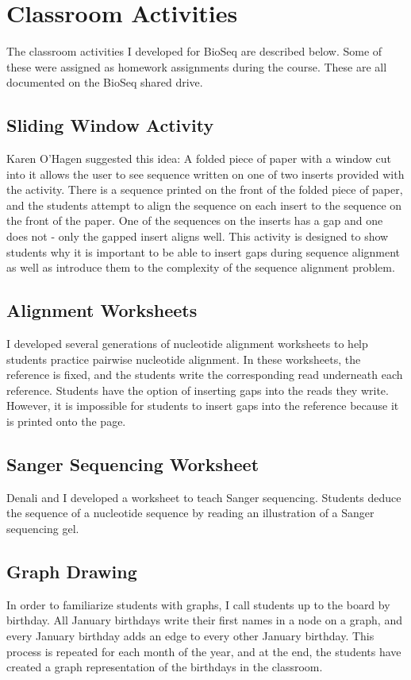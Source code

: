 \documentclass{report}
\begin{document}
\section{Classroom Activities}
The classroom activities I developed for BioSeq are described below. Some of these were assigned as homework assignments during the course. These are all documented on the BioSeq shared drive.

\subsection{Sliding Window Activity}
Karen O'Hagen suggested this idea: A folded piece of paper with a window cut into it allows the user to see sequence written on one of two inserts provided with the activity. There is a sequence printed on the front of the folded piece of paper, and the students attempt to align the sequence on each insert to the sequence on the front of the paper. One of the sequences on the inserts has a gap and one does not - only the gapped insert aligns well. This activity is designed to show students why it is important to be able to insert gaps during sequence alignment as well as introduce them to the complexity of the sequence alignment problem.

\subsection{Alignment Worksheets}
I developed several generations of nucleotide alignment worksheets to help students practice pairwise nucleotide alignment. In these worksheets, the reference is fixed, and the students write the corresponding read underneath each reference. Students have the option of inserting gaps into the reads they write. However, it is impossible for students to insert gaps into the reference because it is printed onto the page.

\subsection{Sanger Sequencing Worksheet}
Denali and I developed a worksheet to teach Sanger sequencing. Students deduce the sequence of a nucleotide sequence by reading an illustration of a Sanger sequencing gel.

\subsection{Graph Drawing}
In order to familiarize students with graphs, I call students up to the board by birthday. All January birthdays write their first names in a node on a graph, and every January birthday adds an edge to every other January birthday. This process is repeated for each month of the year, and at the end, the students have created a graph representation of the birthdays in the classroom.
\end{document}
